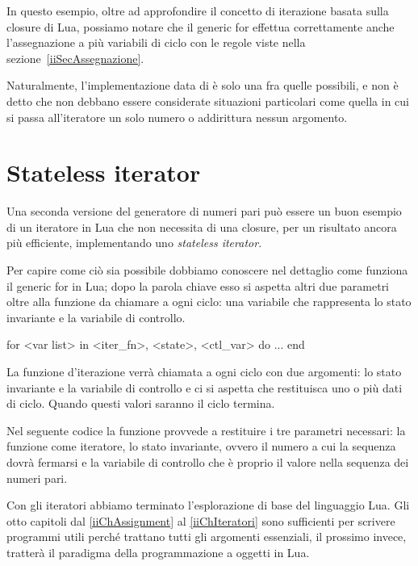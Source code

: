 In questo esempio, oltre ad approfondire il concetto di iterazione basata sulla
closure di Lua, possiamo notare che il generic for effettua correttamente anche
l'assegnazione a più variabili di ciclo con le regole viste nella
sezione~\ref{iiSecAssegnazione}.

Naturalmente, l'implementazione data di  è solo una fra quelle
possibili, e non è detto che non debbano essere considerate situazioni
particolari come quella in cui si passa all'iteratore un solo numero o
addirittura nessun argomento.


\section{Stateless iterator}
\label{iiSecStatelessIter}

Una seconda versione del generatore di numeri pari può essere un buon esempio
di un iteratore in Lua che non necessita di una closure, per un risultato ancora
più efficiente, implementando uno \emph{stateless iterator}.

Per capire come ciò sia possibile dobbiamo conoscere nel dettaglio come funziona
il generic for in Lua; dopo la parola chiave  esso si aspetta
altri due parametri oltre alla funzione da chiamare a ogni ciclo: una variabile
che rappresenta lo stato invariante e la variabile di controllo.
\begin{lines}
for <var list> in <iter_fn>, <state>, <ctl_var> do
    ...
end
\end{lines}

La funzione d'iterazione verrà chiamata a ogni ciclo con due argomenti: lo stato
invariante e la variabile di controllo e ci si aspetta che restituisca uno o più
dati di ciclo. Quando questi valori saranno  il ciclo termina.

Nel seguente codice la funzione  provvede a restituire i tre
parametri necessari: la funzione  come iteratore, lo stato
invariante, ovvero il numero a cui la sequenza dovrà fermarsi e la variabile di
controllo che è proprio il valore nella sequenza dei numeri pari.

Con gli iteratori abbiamo terminato l'esplorazione di base del linguaggio Lua.
Gli otto capitoli dal \ref{iiChAssignment} al \ref{iiChIteratori} sono
sufficienti per scrivere programmi utili perché trattano tutti gli argomenti
essenziali, il prossimo invece, tratterà il paradigma della programmazione a
oggetti in Lua.


